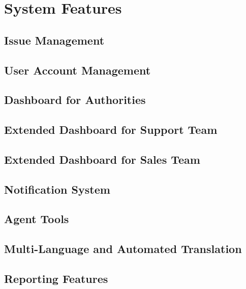     \newpage
    \chapter{System Features}\label{ch:System Features}
        \section{Issue Management}
            
        \section{User Account Management}
            
        \section{Dashboard for Authorities}
            
        \section{Extended Dashboard for Support Team}
              
        \section{Extended Dashboard for Sales Team}
            
        \section{Notification System}
            
        \section{Agent Tools}
            
        \section{Multi-Language and Automated Translation}    
            
        \section{Reporting Features}
            
